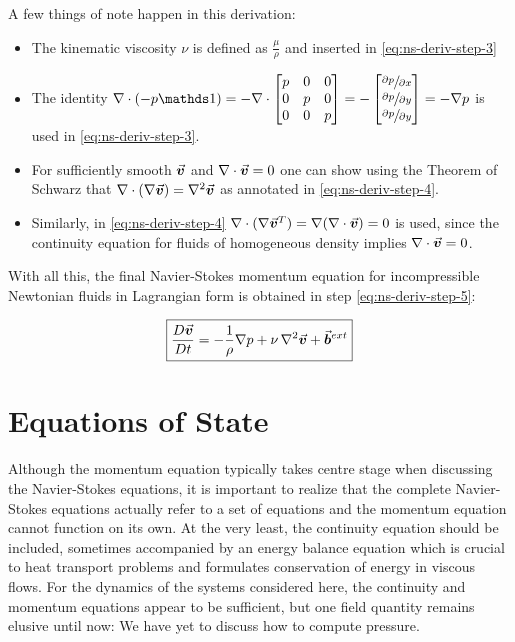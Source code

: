 A few things of note happen in this derivation:
\begin{itemize}
    \item The kinematic viscosity $\nu$ is defined as $\frac{\mu}{\rho}$ and inserted in \autoref{eq:ns-deriv-step-3}
    \item The identity $\nabla\cdot(-p\mat{1}) = -\nabla\cdot\begin{bmatrix}
                  p & 0 & 0 \\
                  0 & p & 0 \\
                  0 & 0 & p \\
              \end{bmatrix} = -\begin{bmatrix}
                  \sfrac{\partial p}{\partial x} \\
                  \sfrac{\partial p}{\partial y} \\
                  \sfrac{\partial p}{\partial y} \\
              \end{bmatrix} = -\nabla p$ is used in \autoref{eq:ns-deriv-step-3}.
    \item For sufficiently smooth $\vec{\bm{v}}$ and $\nabla\cdot\vec{\bm{v}}=0$ one can show using the Theorem of Schwarz that $\nabla\cdot(\nabla \vec{\bm{v}})=\mathop{}\!\mathbin\nabla^2\vec{\bm{v}}$ as annotated in \autoref{eq:ns-deriv-step-4}\autocite*{incompressible-flow-volker}.
    \item Similarly, in \autoref{eq:ns-deriv-step-4} $\nabla\cdot(\nabla\vec{\bm{v}}^T) = \nabla(\nabla\cdot\vec{\bm{v}}) =0$ is used\autocite*{incompressible-flow-volker}, since the continuity equation for fluids of homogeneous density implies $\nabla\cdot\vec{\bm{v}}=0$.
\end{itemize}

With all this, the final Navier-Stokes momentum equation for incompressible Newtonian fluids in Lagrangian form is obtained in step \ref{eq:ns-deriv-step-5}:

\begin{equation}\label{eq:navier-stokes-momentum}
    \text{\fbox{$\frac{D\vec{\bm{v}}}{Dt}=-\frac{1}{\rho}\nabla p+\nu\mathop{}\!\mathbin\nabla^2\vec{\bm{v}}+\vec{\bm{b}}^{ext}$}}
\end{equation}

\section{Equations of State}

Although the momentum equation typically takes centre stage when discussing the Navier-Stokes equations, it is important to realize that the complete Navier-Stokes equations actually refer to a set of equations and the momentum equation cannot function on its own. At the very least, the continuity equation should be included, sometimes accompanied by an energy balance equation which is crucial to heat transport problems and formulates conservation of energy in viscous flows\autocite*{anderson}. For the dynamics of the systems considered here, the continuity and momentum equations appear to be sufficient, but one field quantity remains elusive until now: We have yet to discuss how to compute pressure.\\


